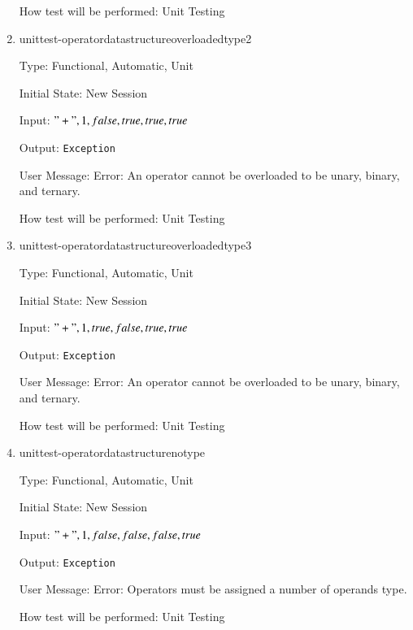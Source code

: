 \documentclass[12pt, titlepage]{article}
\begin{document}
\begin{enumerate}
	How test will be performed: Unit Testing\\
	
	\item{unittest-operatordatastructureoverloadedtype2}
	
	Type: Functional, Automatic, Unit
	
	Initial State: New Session
	
	Input: $"+", 1, false, true, true, true$
	
	Output: \texttt{Exception}
	
	User Message: Error: An operator cannot be overloaded to be unary, binary, 
	and ternary.
	
	How test will be performed: Unit Testing\\
	
	\item{unittest-operatordatastructureoverloadedtype3}
	
	Type: Functional, Automatic, Unit
	
	Initial State: New Session
	
	Input: $"+", 1, true, false, true, true$
	
	Output: \texttt{Exception}
	
	User Message: Error: An operator cannot be overloaded to be unary, binary, 
	and ternary.
	
	How test will be performed: Unit Testing\\
	
	\item{unittest-operatordatastructurenotype}
	
	Type: Functional, Automatic, Unit
	
	Initial State: New Session
	
	Input: $"+", 1, false, false, false, true$
	
	Output: \texttt{Exception}
	
	User Message: Error: Operators must be assigned a number of operands type.
	
	How test will be performed: Unit Testing\\
	
\end{enumerate}
\end{document}
